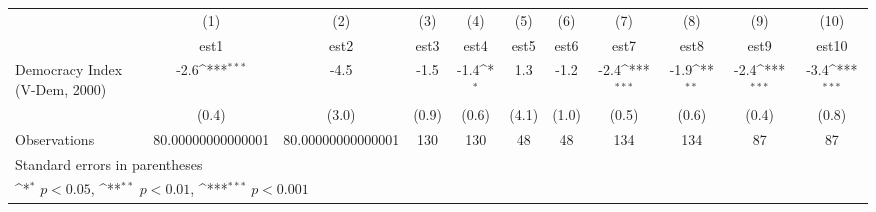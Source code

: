 {
\def\sym#1{\ifmmode^{#1}\else\(^{#1}\)\fi}
\begin{tabular}{l*{10}{c}}
\hline\hline
                    &\multicolumn{1}{c}{(1)}         &\multicolumn{1}{c}{(2)}         &\multicolumn{1}{c}{(3)}         &\multicolumn{1}{c}{(4)}         &\multicolumn{1}{c}{(5)}         &\multicolumn{1}{c}{(6)}         &\multicolumn{1}{c}{(7)}         &\multicolumn{1}{c}{(8)}         &\multicolumn{1}{c}{(9)}         &\multicolumn{1}{c}{(10)}         \\
                    &        est1         &        est2         &        est3         &        est4         &        est5         &        est6         &        est7         &        est8         &        est9         &       est10         \\
\hline
Democracy Index (V-Dem, 2000)&        -2.6\sym{***}&        -4.5         &        -1.5         &        -1.4\sym{*}  &         1.3         &        -1.2         &        -2.4\sym{***}&        -1.9\sym{**} &        -2.4\sym{***}&        -3.4\sym{***}\\
                    &       (0.4)         &       (3.0)         &       (0.9)         &       (0.6)         &       (4.1)         &       (1.0)         &       (0.5)         &       (0.6)         &       (0.4)         &       (0.8)         \\
\hline
Observations        &80.00000000000001         &80.00000000000001         &         130         &         130         &          48         &          48         &         134         &         134         &          87         &          87         \\
\hline\hline
\multicolumn{11}{l}{\footnotesize Standard errors in parentheses}\\
\multicolumn{11}{l}{\footnotesize \sym{*} \(p<0.05\), \sym{**} \(p<0.01\), \sym{***} \(p<0.001\)}\\
\end{tabular}
}
